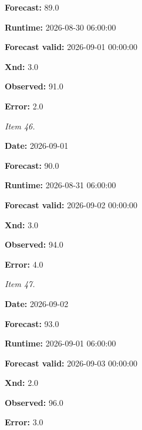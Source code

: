 \documentclass[11pt]{article}
\begin{document}
\par\noindent\textbf{Forecast:} 89.0

\par\noindent\textbf{Runtime:} 2026-08-30 06:00:00

\par\noindent\textbf{Forecast valid:} 2026-09-01 00:00:00

\par\noindent\textbf{Xnd:} 3.0

\par\noindent\textbf{Observed:} 91.0

\par\noindent\textbf{Error:} 2.0

\par\noindent\textit{Item 46.}\par \par\noindent\textbf{Date:} 2026-09-01

\par\noindent\textbf{Forecast:} 90.0

\par\noindent\textbf{Runtime:} 2026-08-31 06:00:00

\par\noindent\textbf{Forecast valid:} 2026-09-02 00:00:00

\par\noindent\textbf{Xnd:} 3.0

\par\noindent\textbf{Observed:} 94.0

\par\noindent\textbf{Error:} 4.0

\par\noindent\textit{Item 47.}\par \par\noindent\textbf{Date:} 2026-09-02

\par\noindent\textbf{Forecast:} 93.0

\par\noindent\textbf{Runtime:} 2026-09-01 06:00:00

\par\noindent\textbf{Forecast valid:} 2026-09-03 00:00:00

\par\noindent\textbf{Xnd:} 2.0

\par\noindent\textbf{Observed:} 96.0

\par\noindent\textbf{Error:} 3.0
\end{document}

